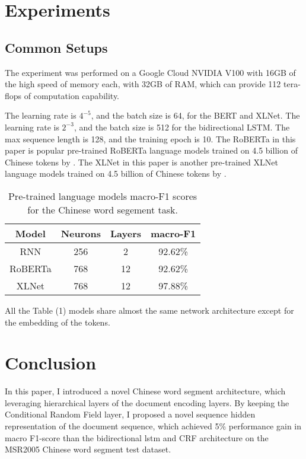 \documentclass[11pt,a4paper]{article}
\begin{document}
\section{Experiments}

\subsection{Common Setups}

\par The experiment was performed on a Google Cloud NVIDIA V100 with 16GB of the high speed of memory each, with 32GB of RAM,
which can provide 112 tera-flops of computation capability.

The learning rate is $4^{-5}$, and the batch size is 64, for the BERT and XLNet.
The learning rate is $2^{-3}$, and the batch size is 512 for the bidirectional LSTM.
The max sequence length is 128, and the training epoch is 10.
The RoBERTa in this paper is popular pre-trained RoBERTa language models trained on 4.5 billion of Chinese tokens by \citet{cui2020revisiting}.
The XLNet in this paper is another pre-trained XLNet language models trained on 4.5 billion of Chinese tokens by \citet{cui2020revisiting}.

\begin{table}
\centering
\begin{tabular}{cccc}
\hline
\textbf{Model} & \textbf{Neurons}& \textbf{Layers} & \textbf{macro-F1} \\
\hline
RNN & 256 & 2 & 92.62\% \\
RoBERTa & 768 & 12 & 92.62\% \\
XLNet & 768 & 12 & 97.88\% \\
\hline
\end{tabular}
\caption{Pre-trained language models macro-F1 scores for the Chinese word segement task.}
\end{table}


All the Table (1) models share almost the same network architecture except for the embedding of the tokens.


\section{Conclusion}

In this paper, I introduced a novel Chinese word segment architecture, which leveraging hierarchical layers of the document encoding layers.
By keeping the Conditional Random Field layer, I proposed a novel sequence hidden representation of the document sequence, which achieved 5\% performance gain in macro F1-score than
the bidirectional lstm and CRF architecture on the MSR2005 Chinese word segment test dataset.





\end{document}
